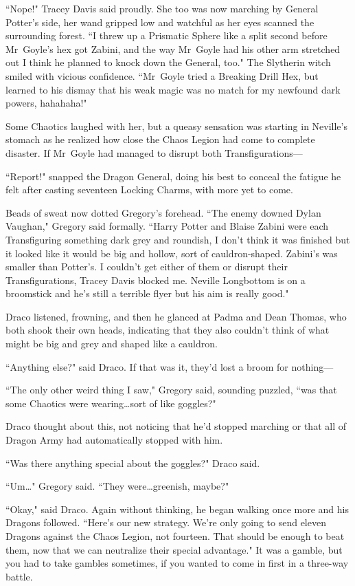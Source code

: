``Nope!" Tracey Davis said proudly. She too was now marching by General Potter's side, her wand gripped low and watchful as her eyes scanned the surrounding forest. ``I threw up a Prismatic Sphere like a split second before Mr~Goyle's hex got Zabini, and the way Mr~Goyle had his other arm stretched out I think he planned to knock down the General, too." The Slytherin witch smiled with vicious confidence. ``Mr~Goyle tried a Breaking Drill Hex, but learned to his dismay that his weak magic was no match for my newfound dark powers, hahahaha!"

Some Chaotics laughed with her, but a queasy sensation was starting in Neville's stomach as he realized how close the Chaos Legion had come to complete disaster. If Mr~Goyle had managed to disrupt both Transfigurations—

\later

``Report!" snapped the Dragon General, doing his best to conceal the fatigue he felt after casting seventeen Locking Charms, with more yet to come.

Beads of sweat now dotted Gregory's forehead. ``The enemy downed Dylan Vaughan," Gregory said formally. ``Harry Potter and Blaise Zabini were each Transfiguring something dark grey and roundish, I don't think it was finished but it looked like it would be big and hollow, sort of cauldron-shaped. Zabini's was smaller than Potter's. I couldn't get either of them or disrupt their Transfigurations, Tracey Davis blocked me. Neville Longbottom is on a broomstick and he's still a terrible flyer but his aim is really good."

Draco listened, frowning, and then he glanced at Padma and Dean Thomas, who both shook their own heads, indicating that they also couldn't think of what might be big and grey and shaped like a cauldron.

``Anything else?" said Draco. If that was it, they'd lost a broom for nothing—

``The only other weird thing I saw," Gregory said, sounding puzzled, ``was that some Chaotics were wearing…sort of like goggles?"

Draco thought about this, not noticing that he'd stopped marching or that all of Dragon Army had automatically stopped with him.

``Was there anything special about the goggles?" Draco said.

``Um…" Gregory said. ``They were…greenish, maybe?"

``Okay," said Draco. Again without thinking, he began walking once more and his Dragons followed. ``Here's our new strategy. We're only going to send eleven Dragons against the Chaos Legion, not fourteen. That should be enough to beat them, now that we can neutralize their special advantage." It was a gamble, but you had to take gambles sometimes, if you wanted to come in first in a three-way battle.


